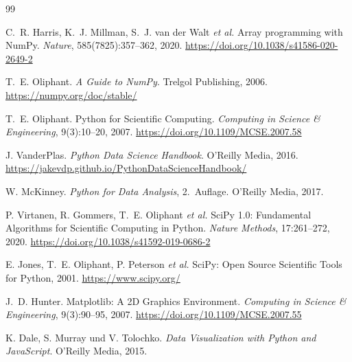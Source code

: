\documentclass[12pt, a4paper]{article}
\begin{document}
\begin{thebibliography}{99}


C.~R. Harris, K.~J. Millman, S.~J. van der Walt \textit{et al.}
Array programming with {NumPy}.
\textit{Nature}, 585(7825):357--362, 2020.
\url{https://doi.org/10.1038/s41586-020-2649-2}

T.~E. Oliphant.
\textit{A Guide to {NumPy}}.
Trelgol Publishing, 2006.
\url{https://numpy.org/doc/stable/}

T.~E. Oliphant.
Python for Scientific Computing.
\textit{Computing in Science \& Engineering}, 9(3):10--20, 2007.
\url{https://doi.org/10.1109/MCSE.2007.58}

J. VanderPlas.
\textit{Python Data Science Handbook}.
O'Reilly Media, 2016.
\url{https://jakevdp.github.io/PythonDataScienceHandbook/}

W. McKinney.
\textit{Python for Data Analysis}, 2.~Auflage.
O'Reilly Media, 2017.


P. Virtanen, R. Gommers, T.~E. Oliphant \textit{et al.}
{SciPy} 1.0: Fundamental Algorithms for Scientific Computing in Python.
\textit{Nature Methods}, 17:261--272, 2020.
\url{https://doi.org/10.1038/s41592-019-0686-2}

E. Jones, T.~E. Oliphant, P. Peterson \textit{et al.}
{SciPy}: Open Source Scientific Tools for Python, 2001.
\url{https://www.scipy.org/}


J.~D. Hunter.
Matplotlib: A {2D} Graphics Environment.
\textit{Computing in Science \& Engineering}, 9(3):90--95, 2007.
\url{https://doi.org/10.1109/MCSE.2007.55}

K. Dale, S. Murray und V. Tolochko.
\textit{Data Visualization with Python and JavaScript}.
O'Reilly Media, 2015.


\end{thebibliography}
\end{document}
